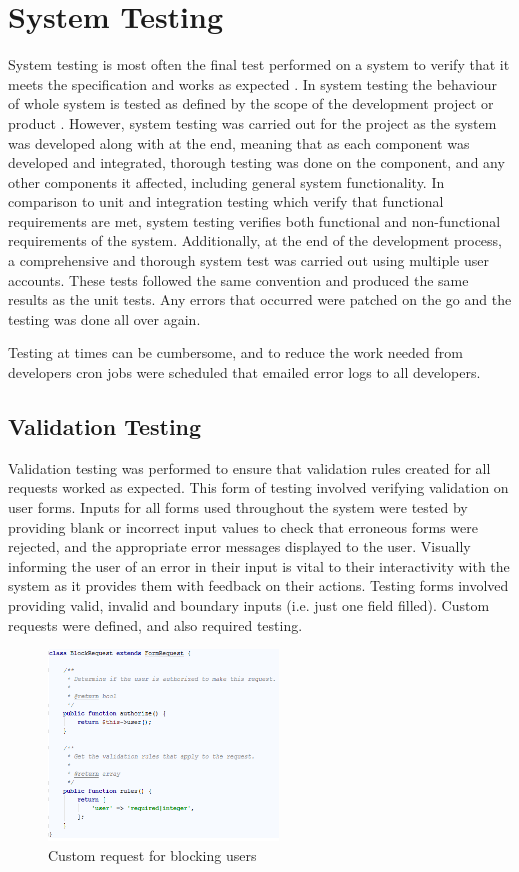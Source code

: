 \section{System Testing}
System testing is most often the final test performed on a system to verify that it meets the specification and works as expected \cite{ISTQB:SystemTesting}. In system testing the behaviour of whole system is tested as defined by the scope of the development project or product \cite{ISTQB:SystemTesting}. However, system testing was carried out for the project as the system was developed along with at the end, meaning that as each component was developed and integrated, thorough testing was done on the component, and any other components it affected, including general system functionality. In comparison to unit and integration testing which verify that functional requirements are met, system testing verifies both functional and non-functional requirements of the system. Additionally, at the end of the development process, a comprehensive and thorough system test was carried out using multiple user accounts. These tests followed the same convention and produced the same results as the unit tests. Any errors that occurred were patched on the go and the testing was done all over again.

Testing at times can be cumbersome, and to reduce the work needed from developers cron jobs were scheduled that emailed error logs to all developers. 

\subsection{Validation Testing}
Validation testing was performed to ensure that validation rules created for all requests worked as expected. This form of testing involved verifying validation on user forms. Inputs for all forms used throughout the system were tested by providing blank or incorrect input values to check that erroneous forms were rejected, and the appropriate error messages displayed to the user. Visually informing the user of an error in their input is vital to their interactivity with the system as it provides them with feedback on their actions. Testing forms involved providing valid, invalid and boundary inputs (i.e. just one field filled). Custom requests were defined, and also required testing.

\begin{figure}[H]
\centering
\includegraphics[height=2in]{Images/Testing/BlockRequest}
\caption{Custom request for blocking users}
\label{fig:BlockRequest}
\end{figure}

